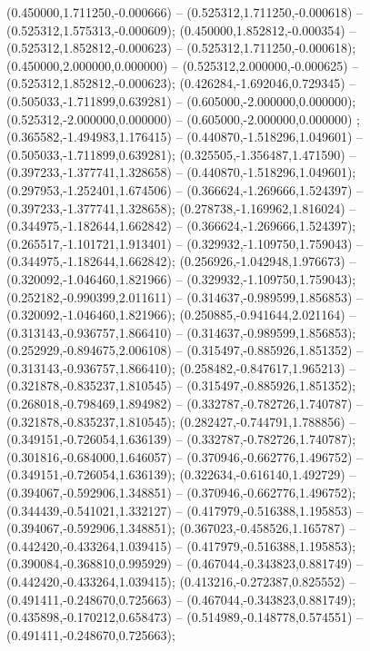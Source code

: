  (0.450000,1.711250,-0.000666) -- (0.525312,1.711250,-0.000618) -- (0.525312,1.575313,-0.000609);
 (0.450000,1.852812,-0.000354) -- (0.525312,1.852812,-0.000623) -- (0.525312,1.711250,-0.000618);
 (0.450000,2.000000,0.000000) -- (0.525312,2.000000,-0.000625) -- (0.525312,1.852812,-0.000623);
 (0.426284,-1.692046,0.729345) -- (0.505033,-1.711899,0.639281) -- (0.605000,-2.000000,0.000000);
 (0.525312,-2.000000,0.000000) -- (0.605000,-2.000000,0.000000) ;
 (0.365582,-1.494983,1.176415) -- (0.440870,-1.518296,1.049601) -- (0.505033,-1.711899,0.639281);
 (0.325505,-1.356487,1.471590) -- (0.397233,-1.377741,1.328658) -- (0.440870,-1.518296,1.049601);
 (0.297953,-1.252401,1.674506) -- (0.366624,-1.269666,1.524397) -- (0.397233,-1.377741,1.328658);
 (0.278738,-1.169962,1.816024) -- (0.344975,-1.182644,1.662842) -- (0.366624,-1.269666,1.524397);
 (0.265517,-1.101721,1.913401) -- (0.329932,-1.109750,1.759043) -- (0.344975,-1.182644,1.662842);
 (0.256926,-1.042948,1.976673) -- (0.320092,-1.046460,1.821966) -- (0.329932,-1.109750,1.759043);
 (0.252182,-0.990399,2.011611) -- (0.314637,-0.989599,1.856853) -- (0.320092,-1.046460,1.821966);
 (0.250885,-0.941644,2.021164) -- (0.313143,-0.936757,1.866410) -- (0.314637,-0.989599,1.856853);
 (0.252929,-0.894675,2.006108) -- (0.315497,-0.885926,1.851352) -- (0.313143,-0.936757,1.866410);
 (0.258482,-0.847617,1.965213) -- (0.321878,-0.835237,1.810545) -- (0.315497,-0.885926,1.851352);
 (0.268018,-0.798469,1.894982) -- (0.332787,-0.782726,1.740787) -- (0.321878,-0.835237,1.810545);
 (0.282427,-0.744791,1.788856) -- (0.349151,-0.726054,1.636139) -- (0.332787,-0.782726,1.740787);
 (0.301816,-0.684000,1.646057) -- (0.370946,-0.662776,1.496752) -- (0.349151,-0.726054,1.636139);
 (0.322634,-0.616140,1.492729) -- (0.394067,-0.592906,1.348851) -- (0.370946,-0.662776,1.496752);
 (0.344439,-0.541021,1.332127) -- (0.417979,-0.516388,1.195853) -- (0.394067,-0.592906,1.348851);
 (0.367023,-0.458526,1.165787) -- (0.442420,-0.433264,1.039415) -- (0.417979,-0.516388,1.195853);
 (0.390084,-0.368810,0.995929) -- (0.467044,-0.343823,0.881749) -- (0.442420,-0.433264,1.039415);
 (0.413216,-0.272387,0.825552) -- (0.491411,-0.248670,0.725663) -- (0.467044,-0.343823,0.881749);
 (0.435898,-0.170212,0.658473) -- (0.514989,-0.148778,0.574551) -- (0.491411,-0.248670,0.725663);
